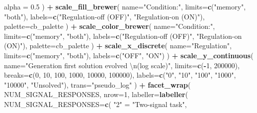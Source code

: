 \documentclass[]{book}
\newenvironment{Shaded}{\begin{snugshade}}{\end{snugshade}}
\newcommand{\CharTok}[1]{\textcolor[rgb]{0.31,0.60,0.02}{#1}}
\newcommand{\DataTypeTok}[1]{\textcolor[rgb]{0.13,0.29,0.53}{#1}}
\newcommand{\DecValTok}[1]{\textcolor[rgb]{0.00,0.00,0.81}{#1}}
\newcommand{\FloatTok}[1]{\textcolor[rgb]{0.00,0.00,0.81}{#1}}
\newcommand{\KeywordTok}[1]{\textcolor[rgb]{0.13,0.29,0.53}{\textbf{#1}}}
\newcommand{\NormalTok}[1]{#1}
\newcommand{\OperatorTok}[1]{\textcolor[rgb]{0.81,0.36,0.00}{\textbf{#1}}}
\newcommand{\StringTok}[1]{\textcolor[rgb]{0.31,0.60,0.02}{#1}}
\begin{document}
\begin{Shaded}
\begin{Highlighting}[]
{{{{    \DataTypeTok{alpha =} \FloatTok{0.5}
\NormalTok{  ) }\OperatorTok{+}
\StringTok{  }\KeywordTok{scale_fill_brewer}\NormalTok{(}
    \DataTypeTok{name=}\StringTok{"Condition:"}\NormalTok{,}
    \DataTypeTok{limits=}\KeywordTok{c}\NormalTok{(}\StringTok{"memory"}\NormalTok{, }\StringTok{"both"}\NormalTok{),}
    \DataTypeTok{labels=}\KeywordTok{c}\NormalTok{(}\StringTok{"Regulation-off (OFF)"}\NormalTok{, }\StringTok{"Regulation-on (ON)"}\NormalTok{),}
    \DataTypeTok{palette=}\NormalTok{cb_palette}
\NormalTok{  ) }\OperatorTok{+}
\StringTok{  }\KeywordTok{scale_color_brewer}\NormalTok{(}
    \DataTypeTok{name=}\StringTok{"Condition:"}\NormalTok{,}
    \DataTypeTok{limits=}\KeywordTok{c}\NormalTok{(}\StringTok{"memory"}\NormalTok{, }\StringTok{"both"}\NormalTok{),}
    \DataTypeTok{labels=}\KeywordTok{c}\NormalTok{(}\StringTok{"Regulation-off (OFF)"}\NormalTok{, }\StringTok{"Regulation-on (ON)"}\NormalTok{),}
    \DataTypeTok{palette=}\NormalTok{cb_palette}
\NormalTok{  ) }\OperatorTok{+}
\StringTok{  }\KeywordTok{scale_x_discrete}\NormalTok{(}
    \DataTypeTok{name=}\StringTok{"Regulation"}\NormalTok{,}
    \DataTypeTok{limits=}\KeywordTok{c}\NormalTok{(}\StringTok{"memory"}\NormalTok{, }\StringTok{"both"}\NormalTok{),}
    \DataTypeTok{labels=}\KeywordTok{c}\NormalTok{(}\StringTok{"OFF"}\NormalTok{, }\StringTok{"ON"}\NormalTok{)}
\NormalTok{  ) }\OperatorTok{+}
\StringTok{  }\KeywordTok{scale_y_continuous}\NormalTok{(}
    \DataTypeTok{name=}\StringTok{"Generation first solution evolved }\CharTok{\textbackslash{}n}\StringTok{(log scale)"}\NormalTok{,}
    \DataTypeTok{limits=}\KeywordTok{c}\NormalTok{(}\OperatorTok{-}\DecValTok{1}\NormalTok{, }\DecValTok{200000}\NormalTok{),}
    \DataTypeTok{breaks=}\KeywordTok{c}\NormalTok{(}\DecValTok{0}\NormalTok{, }\DecValTok{10}\NormalTok{, }\DecValTok{100}\NormalTok{, }\DecValTok{1000}\NormalTok{, }\DecValTok{10000}\NormalTok{, }\DecValTok{100000}\NormalTok{),}
    \DataTypeTok{labels=}\KeywordTok{c}\NormalTok{(}\StringTok{"0"}\NormalTok{, }\StringTok{"10"}\NormalTok{, }\StringTok{"100"}\NormalTok{, }\StringTok{"1000"}\NormalTok{, }\StringTok{"10000"}\NormalTok{, }\StringTok{"Unsolved"}\NormalTok{),}
    \DataTypeTok{trans=}\StringTok{"pseudo_log"}
\NormalTok{  ) }\OperatorTok{+}
\StringTok{  }\KeywordTok{facet_wrap}\NormalTok{(}
    \OperatorTok{~}\StringTok{ }\NormalTok{NUM_SIGNAL_RESPONSES,}
    \DataTypeTok{nrow=}\DecValTok{1}\NormalTok{,}
    \DataTypeTok{labeller=}\KeywordTok{labeller}\NormalTok{(}
      \DataTypeTok{NUM_SIGNAL_RESPONSES=}\KeywordTok{c}\NormalTok{(}
        \StringTok{"2"}\NormalTok{ =}\StringTok{ "Two-signal task"}\NormalTok{,}
}}}}
\end{Highlighting}
\end{Shaded}
\end{document}
